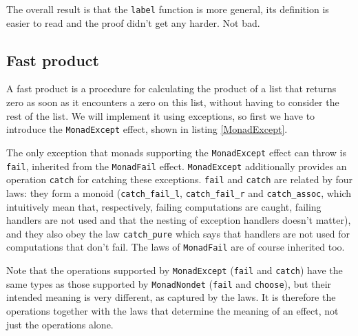 \documentclass[declaration,inz,english,shortabstract]{iithesis}
\newcommand{\m}[1]{\texttt{#1}}
\begin{document}
The overall result is that the \m{label} function is more general, its definition is easier to read and the proof didn't get any harder. Not bad.


\subsection{Fast product}

A fast product is a procedure for calculating the product of a list that returns zero as soon as it encounters a zero on this list, without having to consider the rest of the list. We will implement it using exceptions, so first we have to introduce the \m{MonadExcept} effect, shown in listing \ref{MonadExcept}.


The only exception that monads supporting the \m{MonadExcept} effect can throw is \m{fail}, inherited from the \m{MonadFail} effect. \m{MonadExcept} additionally provides an operation \m{catch} for catching these exceptions. \m{fail} and \m{catch} are related by four laws: they form a monoid (\m{catch\_fail\_l}, \m{catch\_fail\_r} and \m{catch\_assoc}, which intuitively mean that, respectively, failing computations are caught, failing handlers are not used and that the nesting of exception handlers doesn't matter), and they also obey the law \m{catch\_pure} which says that handlers are not used for computations that don't fail. The laws of \m{MonadFail} are of course inherited too.

Note that the operations supported by \m{MonadExcept} (\m{fail} and \m{catch}) have the same types as those supported by \m{MonadNondet} (\m{fail} and \m{choose}), but their intended meaning is very different, as captured by the laws. It is therefore the operations together with the laws that determine the meaning of an effect, not just the operations alone.
\end{document}
